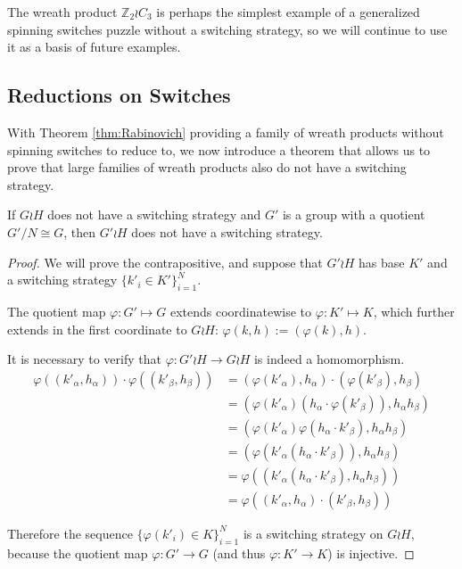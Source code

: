The wreath product $\mathbb Z_2 \wr C_3$ is perhaps the simplest example of a
generalized spinning switches puzzle without a switching strategy,
so we will continue to use it as a basis of future examples.

\subsection{Reductions on Switches}
With Theorem \ref{thm:Rabinovich} providing a family of wreath products without
spinning switches to reduce to, we now introduce a theorem that allows us to
prove that large families of wreath products also do not have a switching
strategy.
\begin{theorem}
  If $G \wr H$ does not have a switching strategy and $G'$ is a group with
  a quotient $G'/N \cong G$, then ${G'} \wr H$ does not have a switching
  strategy.
  \label{thm:SwitchReduction}
\end{theorem}
\begin{proof}
  We will prove the contrapositive, and suppose that $G' \wr H$ has base $K'$
  and a switching strategy $\{k'_i \in K'\}_{i=1}^N$.

  The quotient map
  $\varphi\colon G' \mapsto G$
  extends coordinatewise to
  $\varphi \colon K' \mapsto K$,
  which further extends in the first coordinate to $G \wr H$:
  $\varphi(k,h) := (\varphi(k), h)$.

  It is necessary to verify that $\varphi\colon G' \wr H \rightarrow G \wr H$
  is indeed a homomorphism.
  \begin{align*}
    \varphi((k'_\alpha, h_\alpha)) \cdot \varphi((k'_\beta, h_\beta))
    &= (\varphi(k'_\alpha), h_\alpha) \cdot (\varphi(k'_\beta), h_\beta) \\
    &= (\varphi(k'_\alpha)(h_\alpha\cdot\varphi(k'_\beta)), h_\alpha h_\beta) \\
    &= (\varphi(k'_\alpha)\varphi(h_\alpha\cdot k'_\beta), h_\alpha h_\beta) \\
    &= (\varphi(k'_\alpha(h_\alpha\cdot k'_\beta)), h_\alpha h_\beta) \\
    &= \varphi((k'_\alpha(h_\alpha\cdot k'_\beta), h_\alpha h_\beta)) \\
    &= \varphi((k'_\alpha, h_\alpha) \cdot (k'_\beta, h_\beta))
  \end{align*}

  Therefore the sequence $\{\varphi(k'_i) \in K\}_{i=1}^N$ is a
  switching strategy on $G \wr H$, because the quotient map
  $\varphi \colon G' \rightarrow G$
  (and thus $\varphi \colon K' \rightarrow K$)
  is injective.
\end{proof}
